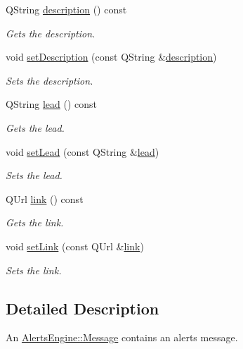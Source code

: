 \begin{DoxyCompactItemize}
Q\+String \mbox{\hyperlink{classQRail_1_1AlertsEngine_1_1Message_a0915a09de9f161ca15af08e198c3aef5}{description}} () const
\begin{DoxyCompactList}\small\item\em Gets the description. \end{DoxyCompactList}\item 
void \mbox{\hyperlink{classQRail_1_1AlertsEngine_1_1Message_a205d7904e25de29a259b7f68d4dac2a7}{set\+Description}} (const Q\+String \&\mbox{\hyperlink{classQRail_1_1AlertsEngine_1_1Message_a0915a09de9f161ca15af08e198c3aef5}{description}})
\begin{DoxyCompactList}\small\item\em Sets the description. \end{DoxyCompactList}\item 
Q\+String \mbox{\hyperlink{classQRail_1_1AlertsEngine_1_1Message_a9dae467ea28e07e75d2b18f113516552}{lead}} () const
\begin{DoxyCompactList}\small\item\em Gets the lead. \end{DoxyCompactList}\item 
void \mbox{\hyperlink{classQRail_1_1AlertsEngine_1_1Message_a737ca83ba775f3c836cff2530ff2449d}{set\+Lead}} (const Q\+String \&\mbox{\hyperlink{classQRail_1_1AlertsEngine_1_1Message_a9dae467ea28e07e75d2b18f113516552}{lead}})
\begin{DoxyCompactList}\small\item\em Sets the lead. \end{DoxyCompactList}\item 
Q\+Url \mbox{\hyperlink{classQRail_1_1AlertsEngine_1_1Message_a230424a1a57b9616ab6057cfa0d9aeba}{link}} () const
\begin{DoxyCompactList}\small\item\em Gets the link. \end{DoxyCompactList}\item 
void \mbox{\hyperlink{classQRail_1_1AlertsEngine_1_1Message_aa4c1f5cd9f81e74b7dd7a43c18e267cf}{set\+Link}} (const Q\+Url \&\mbox{\hyperlink{classQRail_1_1AlertsEngine_1_1Message_a230424a1a57b9616ab6057cfa0d9aeba}{link}})
\begin{DoxyCompactList}\small\item\em Sets the link. \end{DoxyCompactList}\end{DoxyCompactItemize}


\subsection{Detailed Description}
An \mbox{\hyperlink{classQRail_1_1AlertsEngine_1_1Message}{Alerts\+Engine\+::\+Message}} contains an alerts message. 

